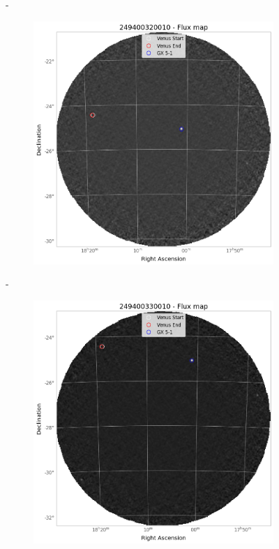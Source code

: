 \begin{figure}[H]
\begin{subfigure}{.3\textwidth}
        \end{subfigure}
        \hspace{1em}-
        \begin{subfigure}{.3\textwidth}
            \centering
            \includegraphics[width=\textwidth]{report/Figures/methods/2204/32_map.png}
        \end{subfigure}
        \hspace{1em}-
        \begin{subfigure}{.3\textwidth}
            \centering
            \includegraphics[width=\textwidth]{report/Figures/methods/2204/33_map.png}
        \end{subfigure}
        \caption{}
        \label{22_flux_map}
        \end{figure}


